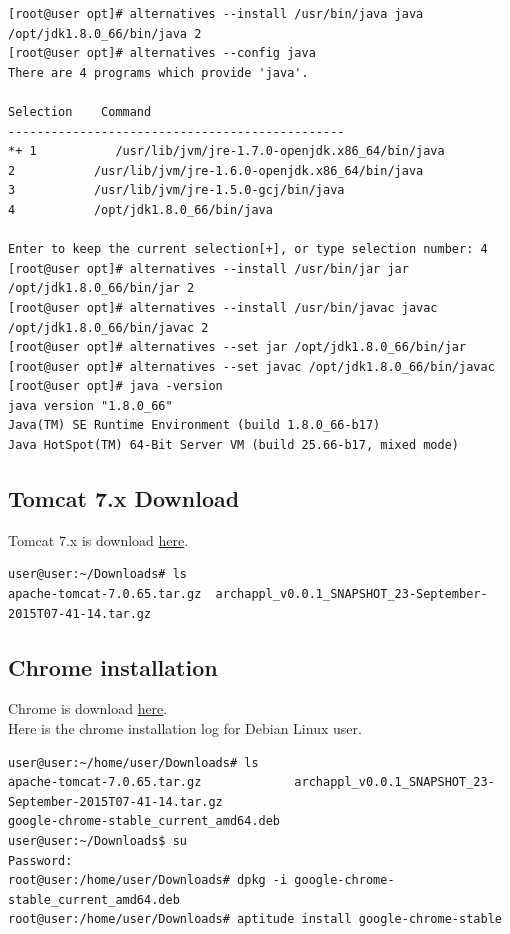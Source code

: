 \documentclass[11pt
  , a4paper
  , article
  , oneside
]{memoir}
\begin{document}
\begin{lstlisting}[style=termstyle]
[root@user opt]# alternatives --install /usr/bin/java java /opt/jdk1.8.0_66/bin/java 2
[root@user opt]# alternatives --config java
There are 4 programs which provide 'java'.

Selection    Command
-----------------------------------------------
*+ 1           /usr/lib/jvm/jre-1.7.0-openjdk.x86_64/bin/java
2           /usr/lib/jvm/jre-1.6.0-openjdk.x86_64/bin/java
3           /usr/lib/jvm/jre-1.5.0-gcj/bin/java
4           /opt/jdk1.8.0_66/bin/java

Enter to keep the current selection[+], or type selection number: 4
[root@user opt]# alternatives --install /usr/bin/jar jar /opt/jdk1.8.0_66/bin/jar 2
[root@user opt]# alternatives --install /usr/bin/javac javac /opt/jdk1.8.0_66/bin/javac 2
[root@user opt]# alternatives --set jar /opt/jdk1.8.0_66/bin/jar
[root@user opt]# alternatives --set javac /opt/jdk1.8.0_66/bin/javac 
[root@user opt]# java -version
java version "1.8.0_66"
Java(TM) SE Runtime Environment (build 1.8.0_66-b17)
Java HotSpot(TM) 64-Bit Server VM (build 25.66-b17, mixed mode)
\end{lstlisting}
\subsection{Tomcat 7.x Download}
Tomcat 7.x is download \href{https://tomcat.apache.org/download-70.cgi}{here}.
\begin{lstlisting}[style=termstyle]
user@user:~/Downloads# ls
apache-tomcat-7.0.65.tar.gz  archappl_v0.0.1_SNAPSHOT_23-September-2015T07-41-14.tar.gz  
\end{lstlisting}
\subsection{Chrome installation}
Chrome is download \href{https://www.google.com/chrome/browser/desktop/index.html}{here}.\\
Here is the chrome installation log for Debian Linux user.
\begin{lstlisting}[style=termstyle]
user@user:~/home/user/Downloads# ls
apache-tomcat-7.0.65.tar.gz             archappl_v0.0.1_SNAPSHOT_23-September-2015T07-41-14.tar.gz
google-chrome-stable_current_amd64.deb
user@user:~/Downloads$ su
Password: 
root@user:/home/user/Downloads# dpkg -i google-chrome-stable_current_amd64.deb
root@user:/home/user/Downloads# aptitude install google-chrome-stable
\end{lstlisting}
\end{document}
